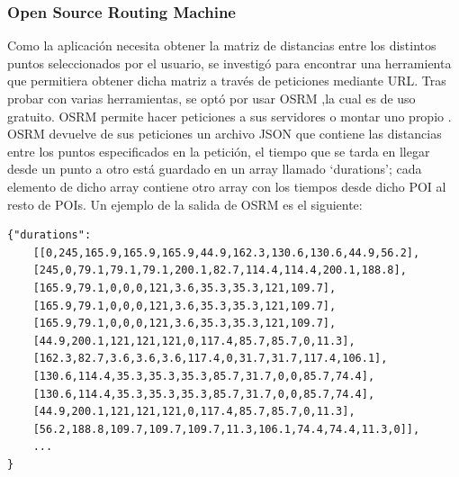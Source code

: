 \subsubsection[OSRM]{Open Source Routing Machine}
Como la aplicación necesita obtener la matriz de distancias entre los distintos puntos seleccionados por el usuario, se investigó para encontrar una herramienta que permitiera obtener dicha matriz a través de peticiones mediante URL.\newline
Tras probar con varias herramientas, se optó por usar OSRM \cite{osmr},la cual es de uso gratuito. OSRM permite hacer peticiones a sus servidores\cite{osmr_doc} o montar uno propio \cite{osmr_backend}.\newline
OSRM devuelve de sus peticiones un archivo JSON que contiene las distancias entre los puntos especificados en la petición, el tiempo que se tarda en llegar desde un punto a otro está guardado en un array llamado \enquote*{durations}; cada elemento de dicho array contiene otro array con los tiempos desde dicho POI al resto de POIs. Un ejemplo de la salida de OSRM es el siguiente:
\begin{lstlisting}[caption=Salida de OSRM.]
{"durations":
	[[0,245,165.9,165.9,165.9,44.9,162.3,130.6,130.6,44.9,56.2],
	[245,0,79.1,79.1,79.1,200.1,82.7,114.4,114.4,200.1,188.8],
	[165.9,79.1,0,0,0,121,3.6,35.3,35.3,121,109.7],
	[165.9,79.1,0,0,0,121,3.6,35.3,35.3,121,109.7],
	[165.9,79.1,0,0,0,121,3.6,35.3,35.3,121,109.7],
	[44.9,200.1,121,121,121,0,117.4,85.7,85.7,0,11.3],
	[162.3,82.7,3.6,3.6,3.6,117.4,0,31.7,31.7,117.4,106.1],
	[130.6,114.4,35.3,35.3,35.3,85.7,31.7,0,0,85.7,74.4],
	[130.6,114.4,35.3,35.3,35.3,85.7,31.7,0,0,85.7,74.4],
	[44.9,200.1,121,121,121,0,117.4,85.7,85.7,0,11.3],
	[56.2,188.8,109.7,109.7,109.7,11.3,106.1,74.4,74.4,11.3,0]],
	...
}
\end{lstlisting}

